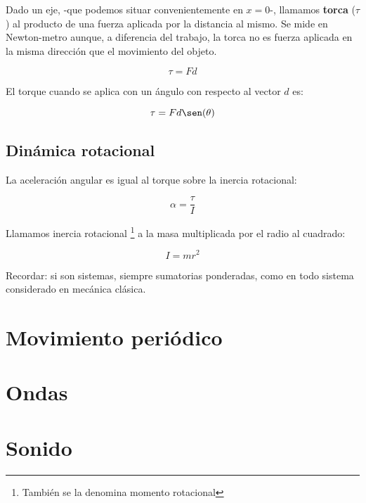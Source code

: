 \documentclass[12pt]{article}
\begin{document}
Dado un eje,
-que podemos situar convenientemente en \(x=0\)-,
llamamos \textbf{torca} (\(\tau\)) al producto de una fuerza aplicada por la distancia al mismo.
Se mide en Newton-metro aunque,
a diferencia del trabajo,
la torca no es fuerza aplicada en la misma dirección que el movimiento del objeto.

\begin{equation}
	\tau = Fd
\end{equation}

El torque cuando se aplica con un ángulo con respecto al vector \(d\) es:

\begin{equation}
	\tau = Fd\sen(\theta)
\end{equation}

\subsection{Dinámica rotacional}

La aceleración angular es igual al torque sobre la inercia rotacional:

\begin{equation}
	\alpha = \frac{\tau}{I}
\end{equation}

Llamamos inercia rotacional
\footnote{También se la denomina momento rotacional} 
a la masa multiplicada por el radio al cuadrado:

\begin{equation}
	I = mr^{2}
\end{equation}

Recordar:
si son sistemas, siempre sumatorias ponderadas,
como en todo sistema considerado en mecánica clásica.


\pagebreak

\section{Movimiento periódico}

\pagebreak

\section{Ondas}

\pagebreak

\section{Sonido}
\end{document}

